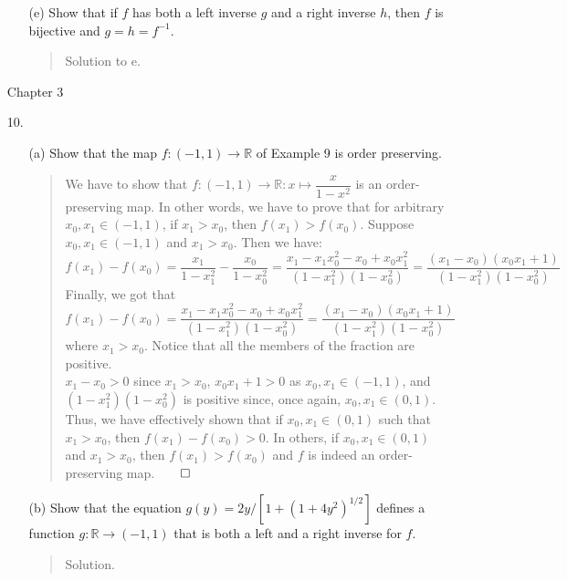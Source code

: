 \documentclass[12pt, a4paper]{article}
\newcommand{\reals}{\mathbb{R}} %
\newcommand{\rarr}{\rightarrow}
\begin{document}
\begin{itemize}
\begin{itemize}
\item[]

\item[(e)]
Show that if $f$ has both a left inverse $g$ and a right inverse $h$, then $f$
is bijective and $g = h = f^{-1}$.
\begin{quote}
Solution to e.
\end{quote}

\end{itemize}

\item[]
\item[]
\item[]

{\large Chapter 3}
\vspace{0.3cm}

\item[10.]
\begin{itemize}
\item[(a)]
Show that the map $f : (-1, 1) \rarr \reals$ of Example 9 is order preserving.
\begin{quote}
We have to show that $f : (-1, 1) \rarr \reals : x \mapsto \dfrac{x}{1 - x^2}$ is
an order-preserving map. In other words, we have to prove that for arbitrary $x_0, x_1 \in (-1, 1)$,
if $x_1 > x_0$, then $f(x_1) > f(x_0)$. Suppose $x_0, x_1 \in (-1, 1)$ and $x_1 > x_0$.
Then we have:
$$f(x_1) - f(x_0) = \dfrac{x_1}{1 - x_1^2} - \dfrac{x_0}{1 - x_0^2} = \dfrac{x_1 - x_1x_0^2 - x_0 + x_0x_1^2}{(1 - x_1^2)(1 - x_0^2)} = \dfrac{(x_1 - x_0)(x_0x_1 + 1)}{(1 - x_1^2)(1 - x_0^2)}$$
\vspace{0.15cm}
Finally, we got that $f(x_1) - f(x_0) = \dfrac{x_1 - x_1x_0^2 - x_0 + x_0x_1^2}{(1 - x_1^2)(1 - x_0^2)} = \dfrac{(x_1 - x_0)(x_0x_1 + 1)}{(1 - x_1^2)(1 - x_0^2)}$
where $x_1 > x_0$. Notice that all the members of the fraction are positive.\\
$x_1 - x_0 > 0$ since $x_1 > x_0$, $x_0x_1 + 1 > 0$ as $x_0, x_1 \in (-1, 1)$, and $(1 - x_1^2)(1 - x_0^2)$ is positive
since, once again, $x_0, x_1 \in (0, 1)$. Thus, we have effectively shown that if $x_0, x_1 \in (0, 1)$ such that $x_1 > x_0$,
then $f(x_1) - f(x_0) > 0$. In others, if $x_0, x_1 \in (0, 1)$ and $x_1 > x_0$, then $f(x_1) > f(x_0)$ and $f$ is indeed an order-preserving map.$\qed$
\end{quote}

\item[]

\item[(b)]
Show that the equation $g(y) = 2y / [1 + (1 + 4y^2)^{1/2}]$ defines a function
$g : \reals \rarr (-1, 1)$ that is both a left and a right inverse for $f$.

\begin{quote}
Solution.
\end{quote}
\end{itemize}



\end{itemize}
\end{document}
